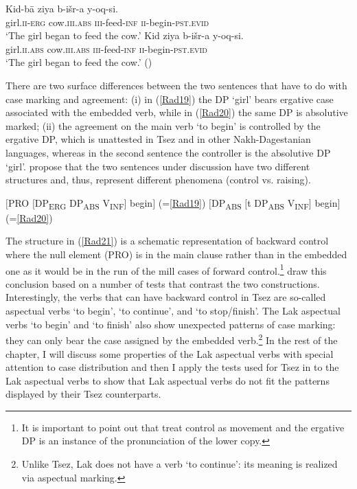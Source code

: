\documentclass[output=paper]{langscibook}
\begin{document}
\ea\label{Rad19}
\gll Kid-bā 	ziya b-išr-a y-oq-si.\\
girl.\textsc{ii-erg} cow.\textsc{iii.abs} \textsc{iii}-feed-\textsc{inf} \textsc{ii}-begin-\textsc{pst.evid}\\
\glt ‘The girl began to feed the cow.’
\ex\label{Rad20}
\gll Kid 	ziya b-išr-a y-oq-si.\\
girl.\textsc{ii.abs} cow.\textsc{iii.abs} \textsc{iii}-feed-\textsc{inf} \textsc{ii}-begin-\textsc{pst.evid}\\
\glt ‘The girl began to feed the cow.’ (\citealt[248--249]{PolinskyPotsdam2002})
\z

There are two surface differences between the two sentences that have to do with case marking and agreement: (i) in (\ref{Rad19}) the DP ‘girl’ bears ergative case associated with the embedded verb, while in (\ref{Rad20}) the same DP is absolutive marked; (ii) the agreement on the main verb ‘to begin’  is controlled by the ergative DP, which is unattested in Tsez and in other Nakh-Dagestanian languages, whereas in the second sentence the controller is the absolutive DP ‘girl’. \citet{PolinskyPotsdam2002} propose that the two sentences under discussion have two different structures and, thus, represent different phenomena (control vs. raising). 

\ea\label{Rad21}
$[$PRO $[$DP\textsubscript{ERG} DP\textsubscript{ABS} V\textsubscript{INF}$]$ begin$]$ (=\ref{Rad19})
\ex\label{Rad22}
$[$DP\textsubscript{ABS} $[$t DP\textsubscript{ABS} V\textsubscript{INF}$]$ begin$]$ (=\ref{Rad20})
\z

The structure in (\ref{Rad21}) is a schematic representation of backward control where the null element (PRO) is in the main clause rather than in the embedded one as it would be in the run of the mill cases of forward control.\footnote{It is important to point out that \citet{PolinskyPotsdam2002} treat control as movement \citep{hornstein1999} and the ergative DP is an instance of the pronunciation of the lower copy.} \citet{PolinskyPotsdam2002} draw this conclusion based on a number of tests that contrast the two constructions. Interestingly, the verbs that can have backward control in Tsez are so-called aspectual verbs ‘to begin’, ‘to continue’, and ‘to stop/finish’. The Lak aspectual verbs ‘to begin’ and ‘to finish’ also show unexpected patterns of case marking: they can only bear the case assigned by the embedded verb.\footnote{Unlike Tsez, Lak does not have a verb ‘to continue’: its meaning is realized via aspectual marking.} In the rest of the chapter, I will discuss some properties of the Lak aspectual verbs with special attention to case distribution and then I apply the tests used for Tsez in \citet{PolinskyPotsdam2002} to the Lak aspectual verbs to show that Lak aspectual verbs do not fit the patterns displayed by their Tsez counterparts.
\end{document}
